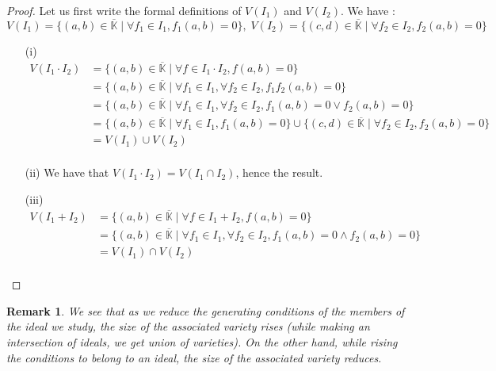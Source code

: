 \documentclass{article}
\newtheorem{remark}{Remark}[section]
\begin{document}
\begin{proof}
    Let us first write the formal definitions of $V(I_{1})$ and $V(I_{2})$. We have : \\
    \begin{displaymath}
        V(I_{1}) = \{ (a, b) \in \overline{\mathbb{K}} \mid \forall f_{1} \in I_{1}, f_{1}(a, b) = 0 \}, \;
        V(I_{2}) = \{ (c, d) \in \overline{\mathbb{K}} \mid \forall f_{2} \in I_{2}, f_{2}(a, b) = 0 \} 
    \end{displaymath}
    \begin{enumerate}
        \item[(i)] 
        \begin{align*}
            V(I_{1} \cdot I_{2})
            & = \{(a, b) \in \overline{\mathbb{K}} \mid \forall f \in I_{1} \cdot I_{2}, f(a, b) = 0\} \\
            & = \{ (a, b) \in \overline{\mathbb{K}} \mid \forall f_{1} \in I_{1}, \forall f_{2} \in I_{2}, f_{1}f_{2}(a, b) = 0 \} \\ %
            & = \{ (a, b) \in \overline{\mathbb{K}} \mid \forall f_{1} \in I_{1}, \forall f_{2} \in I_{2}, f_{1}(a, b) = 0 \lor f_{2}(a, b) = 0 \} \\
            & = \{ (a, b) \in \overline{\mathbb{K}} \mid \forall f_{1} \in I_{1}, f_{1}(a, b) = 0 \} \cup 
            \{ (c, d) \in \overline{\mathbb{K}} \mid \forall f_{2} \in I_{2}, f_{2}(a, b) = 0 \} \\
            & = V(I_{1}) \cup V(I_{2}) \\
        \end{align*}
        \item[(ii)] We have that $V(I_{1} \cdot I_{2}) = V(I_{1} \cap I_{2})$, hence the result.
        \item[(iii)] 
        \begin{align*} 
            V(I_{1} + I_{2}) 
            & = \{ (a, b) \in \overline{\mathbb{K}} \mid \forall f \in I_{1} + I_{2}, f(a, b) = 0\} \\
            & = \{ (a, b) \in \overline{\mathbb{K}} \mid \forall f_{1} \in I_{1}, \forall f_{2} \in I_{2}, f_{1}(a, b) = 0 \land f_{2}(a, b) = 0 \} \\
            & = V(I_{1}) \cap V(I_{2}) \\
        \end{align*}
    \end{enumerate}
\end{proof}

\begin{remark}
    We see that as we \textit{reduce} the generating conditions of the members of the ideal we study, the size of the associated variety rises (while making an intersection of ideals, we get union of varieties). On the other hand, while rising the conditions to belong to an ideal, the size of the associated variety reduces.
\end{remark}
\end{document}
